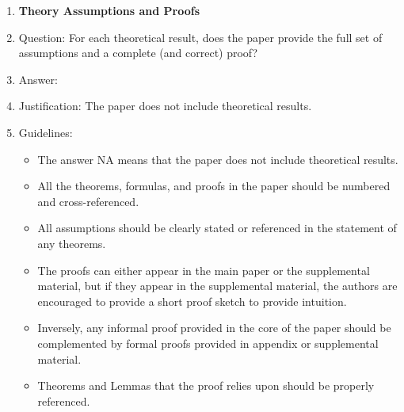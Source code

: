 \documentclass{article}
\begin{document}
{\begin{enumerate}
\item {\bf Theory Assumptions and Proofs}
    \item[] Question: For each theoretical result, does the paper provide the full set of assumptions and a complete (and correct) proof?
    \item[] Answer: \answerNA{} %
    \item[] Justification: The paper does not include theoretical results.
    \item[] Guidelines:
    \begin{itemize}
        \item The answer NA means that the paper does not include theoretical results.
        \item All the theorems, formulas, and proofs in the paper should be numbered and cross-referenced.
        \item All assumptions should be clearly stated or referenced in the statement of any theorems.
        \item The proofs can either appear in the main paper or the supplemental material, but if they appear in the supplemental material, the authors are encouraged to provide a short proof sketch to provide intuition.
        \item Inversely, any informal proof provided in the core of the paper should be complemented by formal proofs provided in appendix or supplemental material.
        \item Theorems and Lemmas that the proof relies upon should be properly referenced.
    \end{itemize}


\end{enumerate}}
\end{document}
